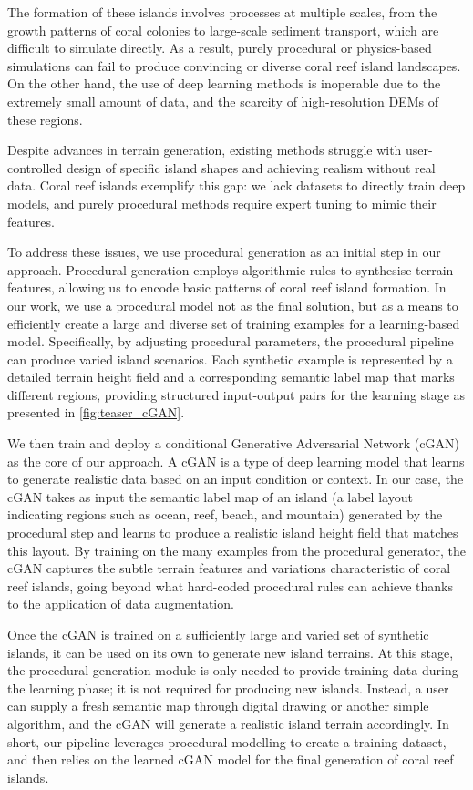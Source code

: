 The formation of these islands involves processes at multiple scales, from the growth patterns of coral colonies to large-scale sediment transport, which are difficult to simulate directly. As a result, purely procedural or physics-based simulations can fail to produce convincing or diverse coral reef island landscapes. On the other hand, the use of deep learning methods is inoperable due to the extremely small amount of data, and the scarcity of high-resolution DEMs of these regions.

Despite advances in terrain generation, existing methods struggle with user-controlled design of specific island shapes and achieving realism without real data. Coral reef islands exemplify this gap: we lack datasets to directly train deep models, and purely procedural methods require expert tuning to mimic their features.

To address these issues, we use procedural generation as an initial step in our approach. Procedural generation employs algorithmic rules to synthesise terrain features, allowing us to encode basic patterns of coral reef island formation. In our work, we use a procedural model not as the final solution, but as a means to efficiently create a large and diverse set of training examples for a learning-based model. Specifically, by adjusting procedural parameters, the procedural pipeline can produce varied island scenarios. Each synthetic example is represented by a detailed terrain height field and a corresponding semantic label map that marks different regions, providing structured input-output pairs for the learning stage as presented in \cref{fig:teaser_cGAN}.

We then train and deploy a conditional Generative Adversarial Network (cGAN) as the core of our approach. A cGAN is a type of deep learning model that learns to generate realistic data based on an input condition or context. In our case, the cGAN takes as input the semantic label map of an island (a label layout indicating regions such as ocean, reef, beach, and mountain) generated by the procedural step and learns to produce a realistic island height field that matches this layout. By training on the many examples from the procedural generator, the cGAN captures the subtle terrain features and variations characteristic of coral reef islands, going beyond what hard-coded procedural rules can achieve thanks to the application of data augmentation.

Once the cGAN is trained on a sufficiently large and varied set of synthetic islands, it can be used on its own to generate new island terrains. At this stage, the procedural generation module is only needed to provide training data during the learning phase; it is not required for producing new islands. Instead, a user can supply a fresh semantic map through digital drawing or another simple algorithm, and the cGAN will generate a realistic island terrain accordingly. In short, our pipeline leverages procedural modelling to create a training dataset, and then relies on the learned cGAN model for the final generation of coral reef islands.


